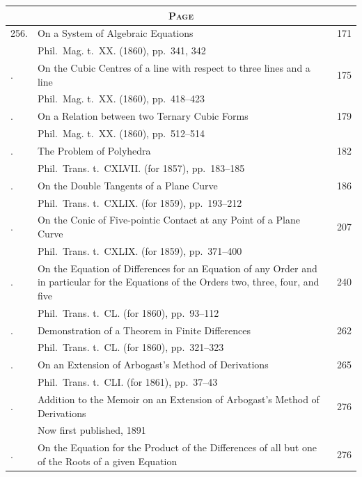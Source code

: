 \documentclass[11pt,a4paper]{book}
\begin{document}
\thispagestyle{empty}
\begin{longtable}{p{0.5in}p{3.8in}p{0.4in}}
\multicolumn{3}{c}{\textsc{Page}} \\
\midrule
\endhead
256. & On a System of Algebraic Equations \dotfill & 171 \\
& \quad Phil.\ Mag. t.~XX. (1860), pp.~341, 342 & \\
\addlinespace
257. & On the Cubic Centres of a line with respect to three lines and a line \dotfill & 175 \\
& \quad Phil.\ Mag. t.~XX. (1860), pp.~418--423 & \\
\addlinespace
258. & On a Relation between two Ternary Cubic Forms \dotfill & 179 \\
& \quad Phil.\ Mag. t.~XX. (1860), pp.~512--514 & \\
\addlinespace
259. & The Problem of Polyhedra \dotfill & 182 \\
& \quad Phil.\ Trans. t.~CXLVII. (for 1857), pp.~183--185 & \\
\addlinespace
260. & On the Double Tangents of a Plane Curve \dotfill & 186 \\
& \quad Phil.\ Trans. t.~CXLIX. (for 1859), pp.~193--212 & \\
\addlinespace
261. & On the Conic of Five-pointic Contact at any Point of a Plane Curve \dotfill & 207 \\
& \quad Phil.\ Trans. t.~CXLIX. (for 1859), pp.~371--400 & \\
\addlinespace
262. & On the Equation of Differences for an Equation of any Order and in particular for the Equations of the Orders two, three, four, and five \dotfill & 240 \\
& \quad Phil.\ Trans. t.~CL. (for 1860), pp.~93--112 & \\
\addlinespace
263. & Demonstration of a Theorem in Finite Differences \dotfill & 262 \\
& \quad Phil.\ Trans. t.~CL. (for 1860), pp.~321--323 & \\
\addlinespace
264. & On an Extension of Arbogast's Method of Derivations \dotfill & 265 \\
& \quad Phil.\ Trans. t.~CLI. (for 1861), pp.~37--43 & \\
\addlinespace
265. & Addition to the Memoir on an Extension of Arbogast's Method of Derivations \dotfill & 276 \\
& \quad Now first published, 1891 & \\
\addlinespace
266. & On the Equation for the Product of the Differences of all but one of the Roots of a given Equation \dotfill & 276 \\

\end{longtable}
\end{document}
